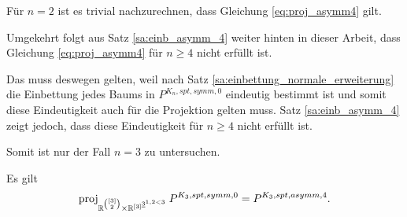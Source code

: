 \documentclass[10p,a4paper,BCOR = 12mm, DIV=15]{scrbook}
\begin{document}
Für $n=2$ ist es trivial nachzurechnen, dass Gleichung \eqref{eq:proj_asymm4} gilt.

Umgekehrt folgt aus Satz \ref{sa:einb_asymm_4} weiter hinten in dieser Arbeit, dass Gleichung \eqref{eq:proj_asymm4} für $n \geq 4$ nicht erfüllt ist.

Das muss deswegen gelten, weil nach Satz \ref{sa:einbettung_normale_erweiterung} die Einbettung jedes Baums in $P^{K_n, spt, symm, 0}$ eindeutig bestimmt ist und somit diese Eindeutigkeit auch für die Projektion gelten muss. Satz \ref{sa:einb_asymm_4} zeigt jedoch, dass diese Eindeutigkeit für $n \geq 4$ nicht erfüllt ist.

Somit ist nur der Fall $n = 3$ zu untersuchen.

\begin{Le}
\label{le:proj_Pasymm4_n3}
Es gilt
\begin{displaymath}
\operatorname{proj}_{\mathbb{R}^{\left[3\right] \choose 2} \times \mathbb{R}^{\left[3\right]^{\underline{3}^{1,2<3}}}} P^{K_3, spt, symm, 0} = P^{K_3, spt, asymm, 4}.
\end{displaymath}
\end{Le}
\end{document}
